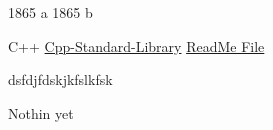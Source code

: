 \documentclass[9pt]{developercv} %
\begin{document}


\begin{entrylist}
	 \entry
		   {1865}
		   {a}
		{ }
		{ }
	 \entry
		   {1865}
		   {b}
		{ }
		{ }
\end{entrylist}



\begin{entrylist}
	 \entry
		   {C++}
		   {\href{https://github.com/AliGholamian-dev/Cpp-Standard-Library}{Cpp-Standard-Library}}
		   {\href{Readme.md}
		   {ReadMe File}}
		 {}
\end{entrylist}


\begin{minipage}[t]{0.3\textwidth}
	\vspace{-\baselineskip} %
	
	
	dsfdjfdskjkfslkfsk
\end{minipage}
\hfill
\begin{minipage}[t]{0.3\textwidth}
	\vspace{-\baselineskip} %
	
	
	Nothin yet
\end{minipage}

\end{document}
